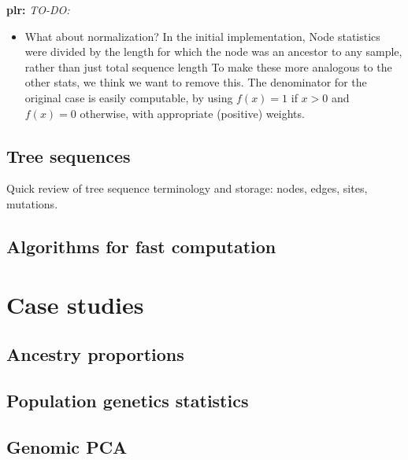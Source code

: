 \documentclass{article}
\newcommand{\plr}[1]{{\color{blue}\textbf{plr:} \it #1}}
\begin{document}
\plr{TO-DO:}
\begin{itemize}

    \item What about normalization?
        In the initial implementation, Node statistics were divided by the length
        for which the node was an ancestor to any sample, rather than just total sequence length
        To make these more analogous to the other stats, we think we want to remove this.
        The denominator for the original case is easily computable, by using
        $f(x) = 1$ if $x>0$ and $f(x)=0$ otherwise, with appropriate (positive) weights.

\end{itemize}


\subsection*{Tree sequences}

Quick review of tree sequence terminology
and storage:
nodes,
edges,
sites,
mutations.


\subsection*{Algorithms for fast computation}



\section*{Case studies}


\subsection*{Ancestry proportions}


\subsection*{Population genetics statistics}


\subsection*{Genomic PCA}
\end{document}
